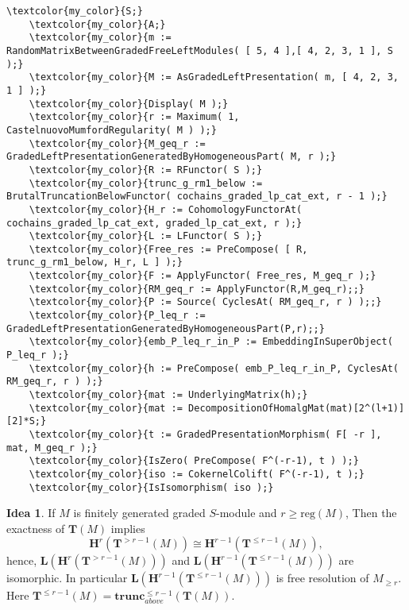 \documentclass[16pt,a4paper]{extarticle}
\theoremstyle{definition}
\newtheorem{idea}{Idea}
\theoremstyle{theorem}
\newcommand{\LL}{\mathbf{L}}
\newcommand{\HH}{\mathbf{H}}
\newcommand{\TT}{\mathbf{T}}
\newcommand{\trunc}{\mathbf{trunc}}
\begin{document}
\begin{Verbatim}[commandchars=\\\{\}, fontseries=b, frame=single, label=Gap Code, framerule=0.5mm, rulecolor=\color{rule_color}]
    \textcolor{my_color}{S;}
    \textcolor{my_color}{A;}
    \textcolor{my_color}{m := RandomMatrixBetweenGradedFreeLeftModules( [ 5, 4 ],[ 4, 2, 3, 1 ], S );}
    \textcolor{my_color}{M := AsGradedLeftPresentation( m, [ 4, 2, 3, 1 ] );}
    \textcolor{my_color}{Display( M );}
    \textcolor{my_color}{r := Maximum( 1, CastelnuovoMumfordRegularity( M ) );}
    \textcolor{my_color}{M_geq_r := GradedLeftPresentationGeneratedByHomogeneousPart( M, r );}
    \textcolor{my_color}{R := RFunctor( S );}
    \textcolor{my_color}{trunc_g_rm1_below := BrutalTruncationBelowFunctor( cochains_graded_lp_cat_ext, r - 1 );}
    \textcolor{my_color}{H_r := CohomologyFunctorAt( cochains_graded_lp_cat_ext, graded_lp_cat_ext, r );}
    \textcolor{my_color}{L := LFunctor( S );}
    \textcolor{my_color}{Free_res := PreCompose( [ R, trunc_g_rm1_below, H_r, L ] );}
    \textcolor{my_color}{F := ApplyFunctor( Free_res, M_geq_r );}
    \textcolor{my_color}{RM_geq_r := ApplyFunctor(R,M_geq_r);;}
    \textcolor{my_color}{P := Source( CyclesAt( RM_geq_r, r ) );;}
    \textcolor{my_color}{P_leq_r := GradedLeftPresentationGeneratedByHomogeneousPart(P,r);;}
    \textcolor{my_color}{emb_P_leq_r_in_P := EmbeddingInSuperObject( P_leq_r );}
    \textcolor{my_color}{h := PreCompose( emb_P_leq_r_in_P, CyclesAt( RM_geq_r, r ) );}
    \textcolor{my_color}{mat := UnderlyingMatrix(h);}
    \textcolor{my_color}{mat := DecompositionOfHomalgMat(mat)[2^(l+1)][2]*S;}
    \textcolor{my_color}{t := GradedPresentationMorphism( F[ -r ], mat, M_geq_r );}
    \textcolor{my_color}{IsZero( PreCompose( F^(-r-1), t ) );}
    \textcolor{my_color}{iso := CokernelColift( F^(-r-1), t );}
    \textcolor{my_color}{IsIsomorphism( iso );}
\end{Verbatim}
    
\begin{idea}
    If $M$ is finitely generated graded $S$-module and $r\geq\mathrm{reg}(M)$, Then the exactness of $\TT(M)$ implies
    $$\HH^r( \TT^{> r-1}(M))\cong \HH^{r-1}( \TT^{\leq r-1}(M)),$$ hence, 
    $\LL(\HH^r( \TT^{> r-1}(M)) )$ and $\LL(\HH^{r-1}( \TT^{\leq r-1}(M)) )$ are isomorphic. In particular 
    $\LL(\HH^{r-1}( \TT^{\leq r-1}(M)) )$ is free resolution of $M_{\geq r}$.
        Here $\TT^{\leq r-1}(M) = \trunc^{\leq r-1}_{above}(\TT(M))$.
\end{idea}
\end{document}
